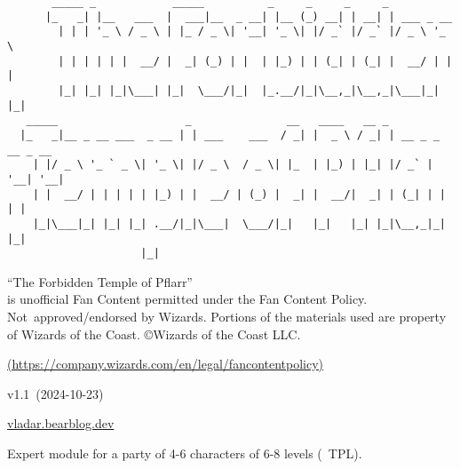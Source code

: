 \documentclass[english,11pt,openany,letterpaper,twocolumn]{book}
\def\title{The Forbidden Temple of Pflarr}
\def\license{%
	``\title''\\is unofficial Fan Content permitted under the Fan Content Policy. Not~approved/endorsed by Wizards. Portions of the materials used are property of Wizards of the Coast. ©Wizards of the Coast LLC.}
\def\licenselink{https://company.wizards.com/en/legal/fancontentpolicy}
\def\modVer{1.1}
\def\modDate{2024-10-23}
\begin{document}
\color{darkgray}


\begin{titlepage}

\begin{Verbatim}
       _____ _            _____          _     _     _     _                 
      |_   _| |__   ___  |  ___|__  _ __| |__ (_) __| | __| | ___ _ __       
        | | | '_ \ / _ \ | |_ / _ \| '__| '_ \| |/ _` |/ _` |/ _ \ '_ \      
        | | | | | |  __/ |  _| (_) | |  | |_) | | (_| | (_| |  __/ | | |     
        |_| |_| |_|\___| |_|  \___/|_|  |_.__/|_|\__,_|\__,_|\___|_| |_|     
   _____                    _               __   ____   __ _                 
  |_   _|__ _ __ ___  _ __ | | ___    ___  / _| |  _ \ / _| | __ _ _ __ _ __ 
    | |/ _ \ '_ ` _ \| '_ \| |/ _ \  / _ \| |_  | |_) | |_| |/ _` | '__| '__|
    | |  __/ | | | | | |_) | |  __/ | (_) |  _| |  __/|  _| | (_| | |  | |   
    |_|\___|_| |_| |_| .__/|_|\___|  \___/|_|   |_|   |_| |_|\__,_|_|  |_|   
                     |_|                                                     
\end{Verbatim}

\vfill

\noindent
\begin{minipage}{\textwidth}
	\setmonofont{TruetypewriterPolyglOTT}
	\renewcommand{\FancyVerbFormatLine}[1]{\vspace*{-0.5ex}#1}
\end{minipage}

\vfill
\vfill

\begin{tabbox}[7][7]
\centering
\license

\href{\licenselink}{(\licenselink)}

v\modVer{}~(\modDate{})

{\href{https://vladar.bearblog.dev}{vladar.bearblog.dev}}
\end{tabbox}

\end{titlepage}

\thispagestyle{empty}

\noindent
\begin{minipage}{\textwidth}
	\begin{textbox}
		\centering
		Expert module for a party of 4-6 characters of 6-8 levels (~TPL).
	\end{textbox}
\end{minipage}
\end{document}
